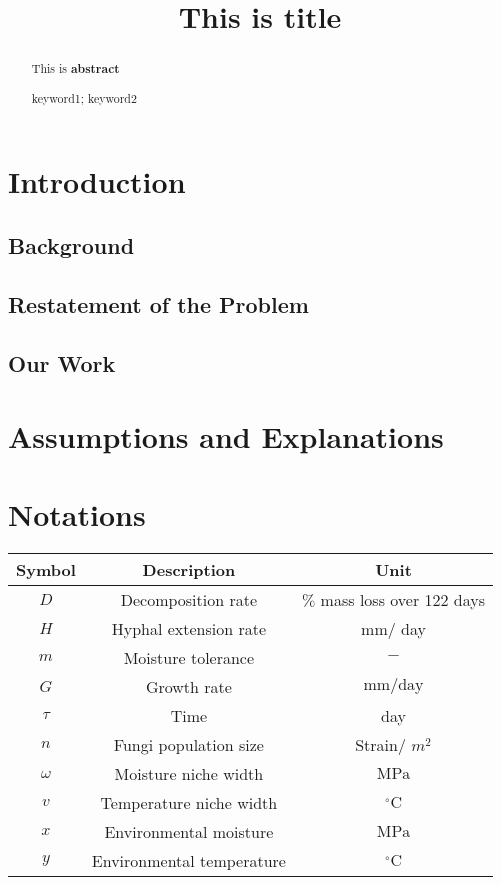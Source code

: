 \documentclass{mcmthesis}
\begin{document}
\title{This is title}
\begin{abstract}
\qquad This is \textbf{abstract}
\begin{keywords}
keyword1; keyword2
\end{keywords}
\end{abstract}
\maketitle
\tableofcontents
\newpage
\section{Introduction}
\subsection{Background}

\subsection{Restatement of the Problem}

\subsection{Our Work}

\section{Assumptions and Explanations}

\section{Notations}
\begin{center}
\begin{tabular}{ccc}
	\toprule[2pt] Symbol & Description & Unit \\
	\midrule[1pt]
	$D$ & Decomposition rate & $\%$ mass loss over 122 days \\
	$H$ & Hyphal extension rate & $\mathrm{mm} /$ day \\
	$m$ & Moisture tolerance & $-$ \\
	$G$ & Growth rate & $\mathrm{mm} / \mathrm{day}$ \\
	$\tau$ & Time & day \\
	$n$ & Fungi population size & Strain/ $m^{2}$ \\
	$\omega$ & Moisture niche width & $\mathrm{MPa}$ \\
	$v$ & Temperature niche width & ${ }^{\circ} \mathrm{C}$ \\
	$x$ & Environmental moisture & $\mathrm{MPa}$ \\
	$y$ & Environmental temperature & ${ }^{\circ} \mathrm{C}$ \\
	\bottomrule[2pt]
\end{tabular}
\end{center}
\end{document}
